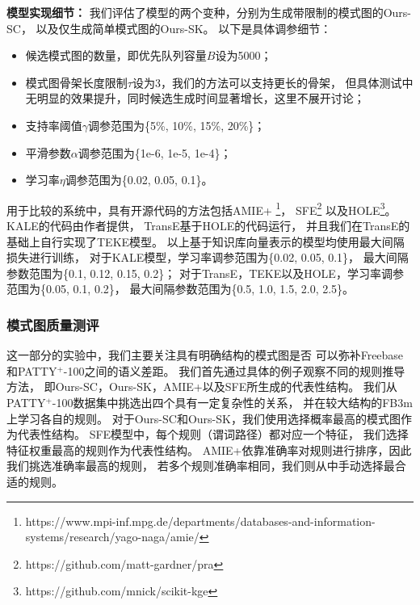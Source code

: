 \textbf{模型实现细节：}
我们评估了模型的两个变种，分别为生成带限制的模式图的Ours-SC，
以及仅生成简单模式图的Ours-SK。
以下是具体调参细节：
\begin{itemize}
\item{候选模式图的数量，即优先队列容量$B$设为5000；}
\item{模式图骨架长度限制$\tau$设为3，我们的方法可以支持更长的骨架，
但具体测试中无明显的效果提升，同时候选生成时间显著增长，这里不展开讨论；}
\item{支持率阈值$\gamma$调参范围为\{5\%, 10\%, 15\%, 20\%\}；}
\item{平滑参数$\alpha$调参范围为\{1e-6, 1e-5, 1e-4\}；}
\item{学习率$\eta$调参范围为\{0.02, 0.05, 0.1\}。}
\end{itemize}
用于比较的系统中，具有开源代码的方法包括AMIE+
\footnote{https://www.mpi-inf.mpg.de/departments/databases-and-information-systems/research/yago-naga/amie/}，
SFE\footnote{https://github.com/matt-gardner/pra}
以及HOLE\footnote{https://github.com/mnick/scikit-kge}。
KALE的代码由作者提供，
TransE基于HOLE的代码运行，
并且我们在TransE的基础上自行实现了TEKE模型。
以上基于知识库向量表示的模型均使用最大间隔损失进行训练，
对于KALE模型，学习率调参范围为\{0.02, 0.05, 0.1\}，
最大间隔参数范围为\{0.1, 0.12, 0.15, 0.2\}；
对于TransE，TEKE以及HOLE，学习率调参范围为\{0.05, 0.1, 0.2\}，
最大间隔参数范围为\{0.5, 1.0, 1.5, 2.0, 2.5\}。


\subsubsection{模式图质量测评}
这一部分的实验中，我们主要关注具有明确结构的模式图是否
可以弥补Freebase和PATTY$^+$-100之间的语义差距。
我们首先通过具体的例子观察不同的规则推导方法，
即Ours-SC，Ours-SK，AMIE+以及SFE所生成的代表性结构。
我们从PATTY$^+$-100数据集中挑选出四个具有一定复杂性的关系，
并在较大结构的FB3m上学习各自的规则。
对于Ours-SC和Ours-SK，我们使用选择概率最高的模式图作为代表性结构。
SFE模型中，每个规则（谓词路径）都对应一个特征，
我们选择特征权重最高的规则作为代表性结构。
AMIE+依靠准确率对规则进行排序，因此我们挑选准确率最高的规则，
若多个规则准确率相同，我们则从中手动选择最合适的规则。

